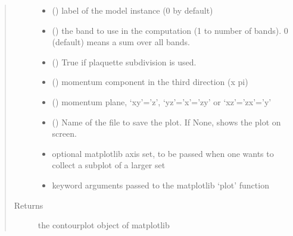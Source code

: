 \documentclass[letterpaper,10pt,english]{sphinxmanual}
\begin{document}
\begin{fulllineitems}
\begin{quote}
\begin{description}
\begin{itemize}
\item {} 
\sphinxAtStartPar
{} () \textendash{} label of the model instance (0 by default)

\item {} 
\sphinxAtStartPar
{} () \textendash{} the band to use in the computation (1 to number of bands). 0 (default) means a sum over all bands.

\item {} 
\sphinxAtStartPar
{} () \textendash{} True if plaquette subdivision is used.

\item {} 
\sphinxAtStartPar
{} () \textendash{} momentum component in the third direction (x pi)

\item {} 
\sphinxAtStartPar
{} () \textendash{} momentum plane, ‘xy’=’z’, ‘yz’=’x’=’zy’ or ‘xz’=’zx’=’y’

\item {} 
\sphinxAtStartPar
{} () \textendash{} Name of the file to save the plot. If None, shows the plot on screen.

\item {} 
\sphinxAtStartPar
{} \textendash{} optional matplotlib axis set, to be passed when one wants to collect a subplot of a larger set

\item {} 
\sphinxAtStartPar
{} \textendash{} keyword arguments passed to the matplotlib ‘plot’ function

\end{itemize}

\item[{Returns}] \leavevmode
\sphinxAtStartPar
the contourplot object of matplotlib

\end{description}\end{quote}

\end{fulllineitems}
\end{document}
